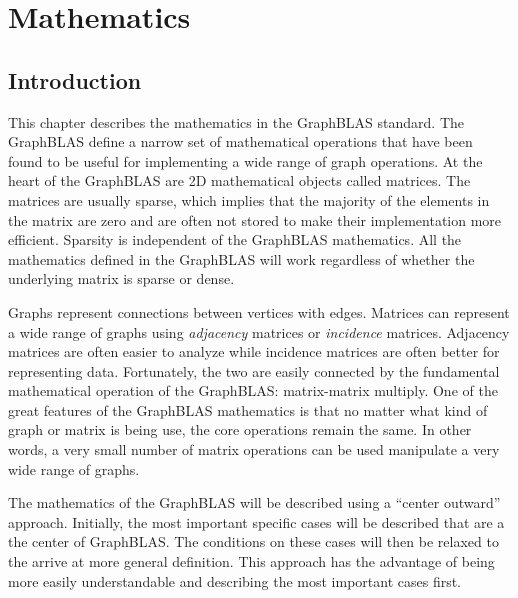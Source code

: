 %

%

\chapter{Mathematics}
\label{chap:mathematics}
\section{Introduction}
This chapter describes the mathematics in the GraphBLAS standard.  The GraphBLAS define a narrow set of mathematical operations that have been found to be useful for implementing a wide range of graph operations.  At the heart of the GraphBLAS are 2D mathematical objects called matrices.  The matrices are usually sparse, which implies that the majority of the elements in the matrix are zero and are often not stored to make their implementation more efficient.  Sparsity is independent of the GraphBLAS mathematics.  All the mathematics defined in the GraphBLAS will work regardless of whether the underlying matrix is sparse or dense.

Graphs represent connections between vertices with edges.  Matrices can represent a wide range of graphs using \emph{adjacency} matrices or \emph{incidence} matrices.  Adjacency matrices are often easier to analyze while incidence matrices are often better for representing data.  Fortunately, the two are easily connected by the fundamental mathematical operation of the GraphBLAS: matrix-matrix multiply.  One of the great features of the GraphBLAS mathematics is that no matter what kind of graph or matrix is being use, the core operations remain the same.  In other words, a very small number of matrix operations can be used manipulate a very wide range of graphs.

The mathematics of the GraphBLAS will be described using a ``center outward'' approach.  Initially, the most important specific cases will be described that are a the center of GraphBLAS.  The conditions on these cases will then be relaxed to the arrive at more general definition.  This approach has the advantage of being more easily understandable and describing the most important cases first.

